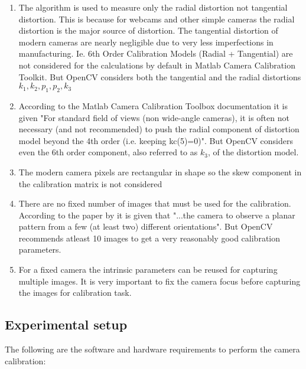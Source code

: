 \begin{enumerate}
	\item The algorithm is used to measure only the radial distortion not tangential distortion. This is because for webcams and other simple cameras the radial distortion is the major source of distortion. The tangential distortion of modern cameras are nearly negligible due to very less imperfections in manufacturing. Ie. 6th Order Calibration Models (Radial + Tangential) are not considered for the calculations by default in Matlab Camera Calibration Toolkit\cite{matlab_2015}. But OpenCV considers both the tangential and the radial distortions { $k_1 , k_2 , p_1 , p_2 , k_3$ }  \cite{OpenCV} 
	
	\item According to the Matlab Camera Calibration Toolbox documentation it is given "For standard field of views (non wide-angle cameras), it is often not necessary (and not recommended) to push the radial component of distortion model beyond the 4th order (i.e. keeping kc(5)=0)"\cite{matlab_2015}. But OpenCV considers even the 6th order component, also referred to as $k_3$, of the distortion model\cite{OpenCV}.
	
	\item The modern camera pixels are rectangular in shape so the skew component in the calibration matrix is not considered \cite{OpenCV}\cite{matlab_2015}
	
	\item There are no fixed number of images that must be used for the calibration. According to the paper by \cite{Zhang2000AFN} it is given that "...the camera to observe a planar pattern from a few (at least two) different orientations". But OpenCV recommends atleast 10 images to get a very reasonably good calibration parameters.
	
	\item For a fixed camera the intrinsic parameters can be reused for capturing multiple images. It is very important to fix the camera focus before capturing the images for calibration task.
	
\end{enumerate}

\subsection{Experimental setup}

The following are the software and hardware requirements to perform the camera calibration:

